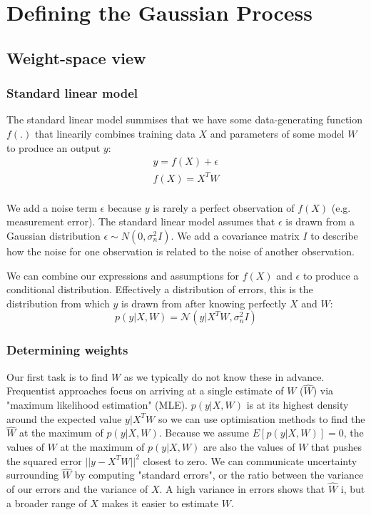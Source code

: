 \section{Defining the Gaussian Process}



\subsection{Weight-space view \cite{gp-ml}}

\subsubsection{Standard linear model}
The standard linear model summises that we have some data-generating function $f(.)$ that linearily combines training data $X$ and parameters of some model $W$ to produce an output $y$:
\begin{equation} \label{eq:linear_model}
    \begin{aligned}
        y = f(X) + \epsilon \\
        f(X) = X^T W \\
    \end{aligned}
\end{equation}

We add a noise term $\epsilon$ because $y$ is rarely a perfect observation of $f(X)$ (e.g. measurement error). The standard linear model assumes that $\epsilon$ is drawn from a Gaussian distribution $\epsilon \sim N(0, \sigma_n^2I)$. We add a covariance matrix $I$ to describe how the noise for one observation is related to the noise of another observation.

We can combine our expressions and assumptions for $f(X)$ and $\epsilon$ to produce a conditional distribution. Effectively a distribution of errors, this is the distribution from which $y$ is drawn from after knowing perfectly $X$ and $W$:
\begin{equation*}
    p(y|X,W) = \mathcal{N}(y | X^TW, \sigma^2_nI)
\end{equation*}


\subsubsection{Determining weights}
Our first task is to find $W$ as we typically do not know these in advance. Frequentist approaches focus on arriving at a single estimate of $W$ ($\hat{W}$) via "maximum likelihood estimation" (MLE). $p(y|X,W)$ is at its highest density around the expected value $y | X^TW$ so we can use optimisation methods to find the $\hat{W}$ at the maximum of $p(y|X,W)$. Because we assume $E[p(y|X,W)] = 0$, the values of $W$ at the maximum of $p(y|X,W)$ are also the values of $W$ that pushes the squared error $||y - X^TW||^2$ closest to zero. We can communicate uncertainty surrounding $\hat{W}$ by computing "standard errors", or the ratio between the variance of our errors and the variance of $X$. A high variance in errors shows that $\hat{W}$ i, but a broader range of $X$ makes it easier to estimate $W$.


